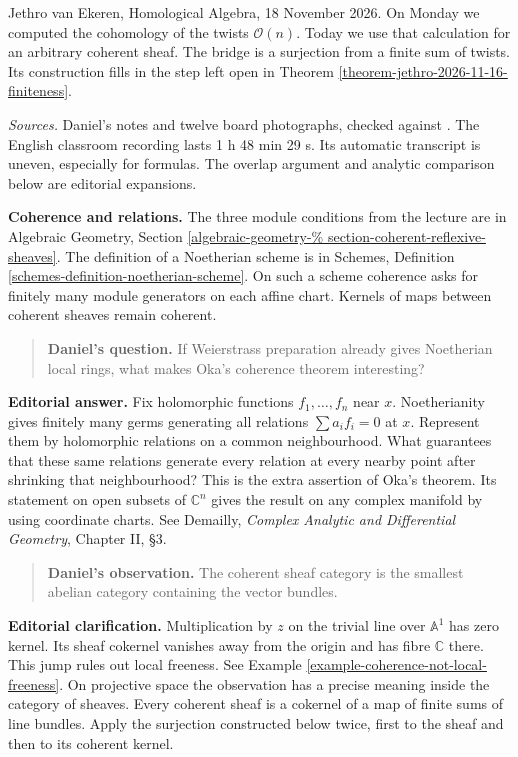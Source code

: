 Jethro van Ekeren, Homological Algebra, 18
November 2026. On Monday we computed the
cohomology of the twists $\mathcal O(n)$.
Today we use that calculation for an
arbitrary coherent sheaf. The bridge is a
surjection from a finite sum of twists. Its
construction fills in the step left open in
Theorem
\ref{theorem-jethro-2026-11-16-finiteness}.

\emph{Sources.} Daniel's notes and twelve
board photographs, checked against
\cite[\S8.6]%
{vanEkerenHomologicalAlgebra2026}.
The English classroom recording lasts
1 h 48 min 29 s. Its automatic transcript
is uneven, especially for formulas.
The overlap argument and analytic comparison
below are editorial expansions.

\medskip\noindent
\textbf{Coherence and relations.}
The three module conditions from the lecture
are in Algebraic Geometry, Section
\ref{algebraic-geometry-%
section-coherent-reflexive-sheaves}.
The definition of a Noetherian scheme is in
Schemes, Definition
\ref{schemes-definition-noetherian-scheme}.
On such a scheme coherence asks for finitely
many module generators on each affine chart.
Kernels of maps between coherent sheaves
remain coherent.

\begin{quote}
\textbf{Daniel's question.}
If Weierstrass preparation already gives
Noetherian local rings, what makes Oka's
coherence theorem interesting?
\end{quote}
\textbf{Editorial answer.}
Fix holomorphic functions $f_1,\ldots,f_n$
near $x$. Noetherianity gives finitely many
germs generating all relations $\sum a_i
f_i=0$ at $x$. Represent them by holomorphic
relations on a common neighbourhood. What
guarantees that these same relations generate
every relation at every nearby point after
shrinking that neighbourhood? This is the
extra assertion of Oka's theorem. Its
statement on open subsets of $\mathbb C^n$
gives the result on any complex manifold by
using coordinate charts. See Demailly,
\emph{Complex Analytic and Differential
Geometry}, Chapter II, \S3.

\begin{quote}
\textbf{Daniel's observation.}
The coherent sheaf category is the smallest
abelian category containing the vector
bundles.
\end{quote}
\textbf{Editorial clarification.}
Multiplication by $z$ on the trivial line
over $\mathbb A^1$ has zero kernel. Its sheaf
cokernel vanishes away from the origin and
has fibre $\mathbb C$ there. This jump rules
out local freeness. See Example
\ref{example-coherence-not-local-freeness}.
On projective space the observation has a
precise meaning inside the category of
sheaves. Every coherent sheaf is a cokernel
of a map of finite sums of line bundles.
Apply the surjection constructed below twice,
first to the sheaf and then to its coherent
kernel.

